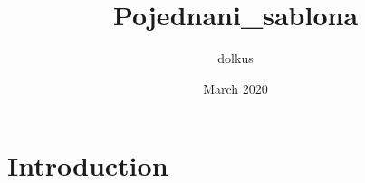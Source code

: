 \documentclass{article}
\title{Pojednani_sablona}
\author{dolkus }
\date{March 2020}
\begin{document}
\maketitle

\section{Introduction}
\end{document}

